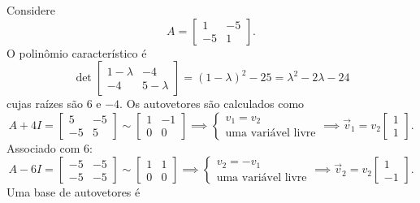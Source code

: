 \documentclass[../livro.tex]{subfiles}
\begin{document}
\begin{example}
	Considere
	\begin{equation}
	A = \begin{bmatrix}
	1 & -5 \\
	-5 &  1
	\end{bmatrix}.
	\end{equation} O polinômio característico é
	\begin{equation}
	\det \begin{bmatrix}
	1-\lambda & -4 \\
	-4 & 5-\lambda
	\end{bmatrix} = (1-\lambda)^2 - 25 = \lambda^2 - 2 \lambda - 24
	\end{equation} cujas raízes são $6$ e  $-4$. Os autovetores são calculados como
	\begin{equation}
	A + 4 I = 
	\begin{bmatrix}
	5 & -5 \\
	-5 & 5
	\end{bmatrix} \sim 
	\begin{bmatrix}
	1 & -1 \\
	0 & 0
	\end{bmatrix} \implies 
	\left\{
	\begin{array}{l}
	v_1 = v_2 \\ 
	\text{uma variável livre}
	\end{array}
	\right. \implies \vec{v}_1 = v_2
	\begin{bmatrix}
	1  \\
	1
	\end{bmatrix}.
	\end{equation} Associado com $6$:
	\begin{equation}
	A - 6 I = 
	\begin{bmatrix}
	-5 & -5 \\
	-5 & -5
	\end{bmatrix} \sim 
	\begin{bmatrix}
	1 & 1 \\
	0 & 0
	\end{bmatrix} \implies 
	\left\{
	\begin{array}{l}
	v_2 = - v_1 \\ 
	\text{uma variável livre}
	\end{array}
	\right. \implies \vec{v}_2 = v_2
	\begin{bmatrix}
	1 \\
	-1
	\end{bmatrix}.
	\end{equation} Uma base de autovetores é

\end{example}
\end{document}
